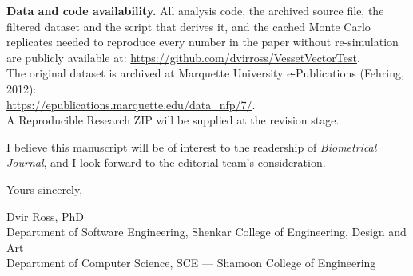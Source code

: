 \documentclass[11pt]{article}
\begin{document}
\medskip
\textbf{Data and code availability.}
All analysis code, the archived source file, the filtered dataset and the script that
derives it, and the cached Monte Carlo replicates needed to reproduce every number in
the paper without re-simulation are publicly available at:
\url{https://github.com/dvirross/VessetVectorTest}.\\
The original dataset is archived at Marquette University e-Publications (Fehring, 2012):\\
\url{https://epublications.marquette.edu/data_nfp/7/}.\\
A Reproducible Research ZIP will be supplied at the revision stage.

\medskip

I believe this manuscript will be of interest to the readership of
\textit{Biometrical Journal}, and I look forward to the editorial team's consideration.

\medskip

Yours sincerely,

\bigskip

Dvir Ross, PhD\\
Department of Software Engineering, Shenkar College of Engineering, Design and Art\\
Department of Computer Science, SCE --- Shamoon College of Engineering
\end{document}
